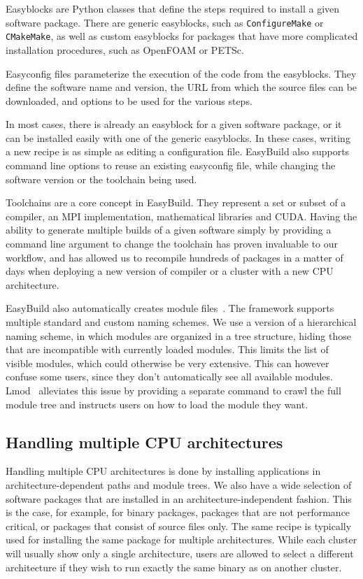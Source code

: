\documentclass[sigconf]{acmart}
\begin{document}
Easyblocks are Python classes that define the steps required to install a given software package. There are generic easyblocks, such as \texttt{ConfigureMake} or \texttt{CMakeMake}, as well as custom easyblocks for packages that have more complicated installation procedures, such as OpenFOAM or PETSc. 

Easyconfig files parameterize the execution of the code from the easyblocks. They define the software name and version, the URL from which the source files can be downloaded, and options to be used for the various steps. 

In most cases, there is already an easyblock for a given software package, or it can be installed easily with one of the generic easyblocks. In these cases, writing a new recipe is as simple as editing a configuration file. EasyBuild also supports command line options to reuse an existing easyconfig file, while changing the software version or the toolchain being used. 

Toolchains are a core concept in EasyBuild. They represent a set or subset of a compiler, an MPI implementation, mathematical libraries and CUDA. Having the ability to generate multiple builds of a given software simply by providing a command line argument to change the toolchain has proven invaluable to our workflow, and has allowed us to recompile hundreds of packages in a matter of days when deploying a new version of compiler or a cluster with a new CPU architecture. 

EasyBuild also automatically creates module files~\cite{Modules1991,Modules1996,Lmod}. The framework supports multiple standard and custom naming schemes. We use a version of a hierarchical naming scheme, in which modules are organized in a tree structure, hiding those that are incompatible with currently loaded modules. This limits the list of visible modules, which could otherwise be very extensive. This can however confuse some users, since they don’t automatically see all available modules. Lmod~\cite{Lmod} alleviates this issue by providing a separate command to crawl the full module tree and instructs users on how to load the module they want.

\subsection{Handling multiple CPU architectures}
\label{sub:Handling_multiple_CPU_architectures}
Handling multiple CPU architectures is done by installing applications in architecture-dependent paths and module trees. We also have a wide selection of software packages that are installed in an architecture-independent fashion. This is the case, for example, for binary packages, packages that are not performance critical, or packages that consist of source files only. The same recipe is typically used for installing the same package for multiple architectures. While each cluster will usually show only a single architecture, users are allowed to select a different architecture if they wish to run exactly the same binary as on another cluster.
\end{document}
